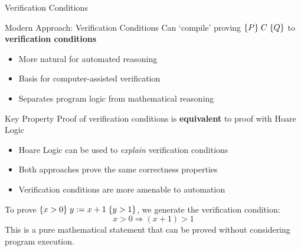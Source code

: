 \begin{frame}{Verification Conditions}
    \begin{block}{Modern Approach: Verification Conditions}
        Can `compile' proving $\{P\}\; C\; \{Q\}$ to \textbf{verification conditions}
        \begin{itemize}
            \item More natural for automated reasoning
            \item Basis for computer-assisted verification
            \item Separates program logic from mathematical reasoning
        \end{itemize}
    \end{block}
    
    \begin{block}{Key Property}
        Proof of verification conditions is \textbf{equivalent} to proof with Hoare Logic
        \begin{itemize}
            \item Hoare Logic can be used to \emph{explain} verification conditions
            \item Both approaches prove the same correctness properties
            \item Verification conditions are more amenable to automation
        \end{itemize}
    \end{block}
    
    \begin{example}
        To prove $\{x > 0\}\; y := x + 1\; \{y > 1\}$, we generate the verification condition:
        \[x > 0 \Rightarrow (x + 1) > 1\]
        This is a pure mathematical statement that can be proved without considering program execution.
    \end{example}
\end{frame}
